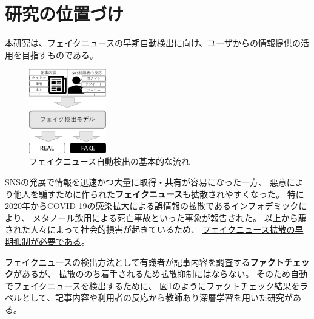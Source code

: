 
\section{研究の位置づけ}

本研究は、フェイクニュースの早期自動検出に向け、ユーザからの情報提供の活用を目指すものである。


\setlength\intextsep{0pt}
\setlength\textfloatsep{0pt}
\begin{figure}
    \centering
    \includegraphics[width=0.3\textwidth]{figs/base_model.pdf}
    \vspace{-1cm} 
    \caption{フェイクニュース自動検出の基本的な流れ}
    \label{fig:objects}
\end{figure}
SNSの発展で情報を迅速かつ大量に取得・共有が容易になった一方、
悪意により他人を騙すために作られた\textbf{フェイクニュース}も拡散されやすくなった。
特に2020年からCOVID-19の感染拡大による誤情報の拡散であるインフォデミックにより、
メタノール飲用による死亡事故\cite{iraninfo}といった事象が報告された。
以上から騙された人々によって社会的損害が起きているため、
\underline{フェイクニュース拡散の早期抑制が必要である}\cite{snsinfo}。

フェイクニュースの検出方法として有識者が記事内容を調査する\textbf{ファクトチェック}があるが、
拡散ののち着手されるため\underline{拡散抑制にはならない}。
そのため自動でフェイクニュースを検出するために、
図\ref{fig:objects}のようにファクトチェック結果をラベルとして、記事内容や利用者の反応から教師あり深層学習を用いた研究がある\cite{Wang:2018:EEA:3219819.3219903}。

